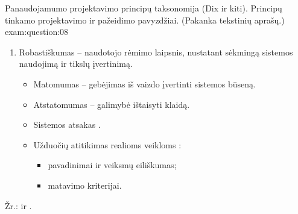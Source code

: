 \begin{question}{%
  Panaudojamumo projektavimo principų taksonomija (Dix ir kiti).
  Principų tinkamo projektavimo ir pažeidimo pavyzdžiai. (Pakanka
  tekstinių aprašų.)
  }{exam:question:08}
\begin{enumerate}
\begin{itemize}
\begin{itemize}
            \item leidimas keisti užduoties formulavimo ar rodymo būdą.
          \end{itemize}
        \item Pritaikomumas  – individualizavimas.
      \end{itemize}
    \item Robastiškumas  – naudotojo rėmimo laipsnis,
      nustatant sėkmingą sistemos naudojimą ir tikslų įvertinimą.
      \begin{itemize}
        \item Matomumas  – gebėjimas iš vaizdo įvertinti
          sistemos būseną.
        \item Atstatomumas  – galimybė ištaisyti
          klaidą.
        \item Sistemos atsakas .
        \item Užduočių atitikimas realioms veikloms :
          \begin{itemize}
            \item pavadinimai ir veiksmų eiliškumas;
            \item matavimo kriterijai.
          \end{itemize}
      \end{itemize}
  \end{enumerate}
  Žr.: \cite[59--64]{konspektas} ir \cite[11--40]{skaidres-4}.
\end{question}
